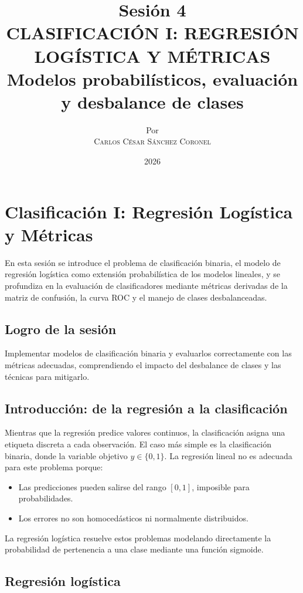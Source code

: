 \documentclass[12pt,a4paper,openany,oneside]{book}
\title{
    \textbf{Sesión 4} \\ 
    \Huge \textbf{CLASIFICACIÓN I: REGRESIÓN LOGÍSTICA Y MÉTRICAS} \\
    \Large Modelos probabilísticos, evaluación y desbalance de clases
}
\author{
    \small Por \\ \vspace{0.2cm}
    \Large \textsc{Carlos César Sánchez Coronel}
}
\date{2026}
\begin{document}
\maketitle
\tableofcontents
{}

\chapter{Clasificación I: Regresión Logística y Métricas}

En esta sesión se introduce el problema de clasificación binaria, el modelo de regresión logística como extensión probabilística de los modelos lineales, y se profundiza en la evaluación de clasificadores mediante métricas derivadas de la matriz de confusión, la curva ROC y el manejo de clases desbalanceadas.

\section{Logro de la sesión}
Implementar modelos de clasificación binaria y evaluarlos correctamente con las métricas adecuadas, comprendiendo el impacto del desbalance de clases y las técnicas para mitigarlo.

\section{Introducción: de la regresión a la clasificación}
Mientras que la regresión predice valores continuos, la clasificación asigna una etiqueta discreta a cada observación. El caso más simple es la clasificación binaria, donde la variable objetivo \(y \in \{0,1\}\). La regresión lineal no es adecuada para este problema porque:
\begin{itemize}
    \item Las predicciones pueden salirse del rango \([0,1]\), imposible para probabilidades.
    \item Los errores no son homocedásticos ni normalmente distribuidos.
\end{itemize}
La regresión logística resuelve estos problemas modelando directamente la probabilidad de pertenencia a una clase mediante una función sigmoide.

\section{Regresión logística}
\end{document}

